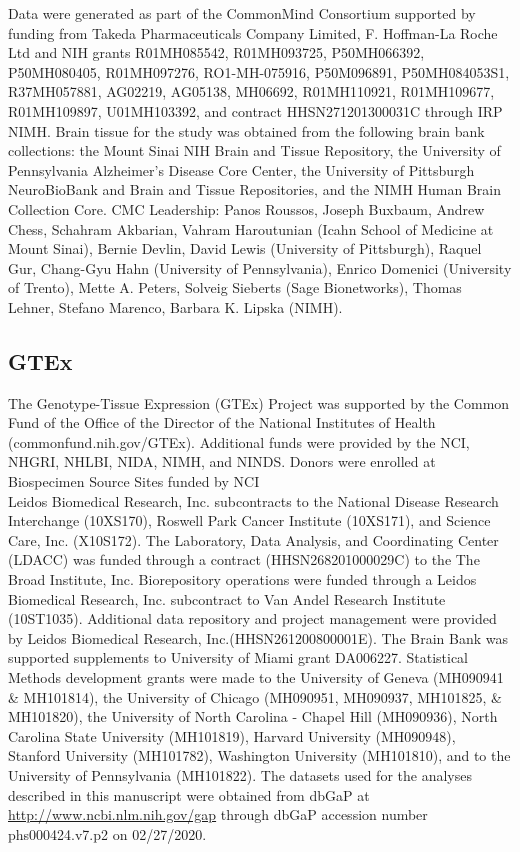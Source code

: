 Data were generated as part of the CommonMind Consortium supported by funding from Takeda Pharmaceuticals Company Limited, F. Hoffman-La Roche Ltd and NIH grants R01MH085542, R01MH093725, P50MH066392, P50MH080405, R01MH097276, RO1-MH-075916, P50M096891, P50MH084053S1, R37MH057881, AG02219, AG05138, MH06692, R01MH110921, R01MH109677, R01MH109897, U01MH103392, and contract HHSN271201300031C through IRP NIMH. Brain tissue for the study was obtained from the following brain bank collections: the Mount Sinai NIH Brain and Tissue Repository, the University of Pennsylvania Alzheimer’s Disease Core Center, the University of Pittsburgh NeuroBioBank and Brain and Tissue Repositories, and the NIMH Human Brain Collection Core. CMC Leadership: Panos Roussos, Joseph Buxbaum, Andrew Chess, Schahram Akbarian, Vahram Haroutunian (Icahn School of Medicine at Mount Sinai), Bernie Devlin, David Lewis (University of Pittsburgh), Raquel Gur, Chang-Gyu Hahn (University of Pennsylvania), Enrico Domenici (University of Trento), Mette A. Peters, Solveig Sieberts (Sage Bionetworks), Thomas Lehner, Stefano Marenco, Barbara K. Lipska (NIMH). 

\subsection*{GTEx}

The Genotype-Tissue Expression (GTEx) Project was supported by the Common Fund of the Office of the Director of the National Institutes of Health (commonfund.nih.gov/GTEx). Additional funds were provided by the NCI, NHGRI, NHLBI, NIDA, NIMH, and NINDS. Donors were enrolled at Biospecimen Source Sites funded by NCI\\Leidos Biomedical Research, Inc. subcontracts to the National Disease Research Interchange (10XS170), Roswell Park Cancer Institute (10XS171), and Science Care, Inc. (X10S172). The Laboratory, Data Analysis, and Coordinating Center (LDACC) was funded through a contract (HHSN268201000029C) to the The Broad Institute, Inc. Biorepository operations were funded through a Leidos Biomedical Research, Inc. subcontract to Van Andel Research Institute (10ST1035). Additional data repository and project management were provided by Leidos Biomedical Research, Inc.(HHSN261200800001E). The Brain Bank was supported supplements to University of Miami grant DA006227. Statistical Methods development grants were made to the University of Geneva (MH090941 \& MH101814), the University of Chicago (MH090951, MH090937, MH101825, \& MH101820), the University of North Carolina - Chapel Hill (MH090936), North Carolina State University (MH101819), Harvard University (MH090948), Stanford University (MH101782), Washington University (MH101810), and to the University of Pennsylvania (MH101822). The datasets used for the analyses described in this manuscript were obtained from dbGaP at \url{http://www.ncbi.nlm.nih.gov/gap} through dbGaP accession number phs000424.v7.p2 on 02/27/2020. 

